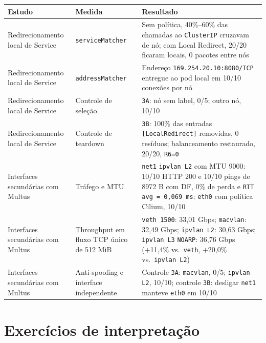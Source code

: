 \documentclass[12pt,openany,oneside,a4paper,chapter=TITLE,english,brazil]{abntex2}
\begin{document}
\begin{quadro}[!htbp]
\caption{Resultados de encaminhamento e Multus}
\footnotesize
\begin{tabularx}{\textwidth}{|>{\raggedright\arraybackslash\hsize=0.755\hsize}X|>{\raggedright\arraybackslash\hsize=0.831\hsize}X|>{\raggedright\arraybackslash\hsize=1.415\hsize}X|}
\hline
\textbf{Estudo} & \textbf{Medida} & \textbf{Resultado} \\
\hline
Redirecionamento local de Service & \texttt{service\allowbreak{}Matcher} & Sem política, 40\%--60\% das chamadas ao \texttt{Cluster\allowbreak{}IP}
cruzavam de nó; com Local Redirect, 20/20 ficaram locais, 0 pacotes
entre nós \\
\hline
Redirecionamento local de Service & \texttt{address\allowbreak{}Matcher} & Endereço
\texttt{169.\allowbreak{}254.\allowbreak{}20.\allowbreak{}10:\allowbreak{}8080/\allowbreak{}TCP}
entregue ao pod local em 10/10 conexões por nó \\
\hline
Redirecionamento local de Service & Controle de seleção & \texttt{3A}: nó sem label, 0/5; outro nó, 10/10 \\
\hline
Redirecionamento local de Service & Controle de teardown & \texttt{3B}: 100\% das entradas \texttt{[Local\allowbreak{}Redirect]}
removidas, 0 resíduos; balanceamento restaurado, 20/20,
\texttt{R6=\allowbreak{}0} \\
\hline
Interfaces secundárias com Multus & Tráfego e MTU & \texttt{net1} \texttt{ipvlan L2} com MTU 9000: 10/10 HTTP 200 e 10/10
pings de 8972 B com DF, 0\% de perda e
\texttt{RTT avg =\allowbreak{} 0,\allowbreak{}069 ms}; \texttt{eth0} com
política Cilium, 10/10 \\
\hline
Interfaces secundárias com Multus & Throughput em fluxo TCP único de 512 MiB & \texttt{veth 1500}: 33,01 Gbps; \texttt{macvlan}: 32,49 Gbps;
\texttt{ipvlan L2}: 30,63 Gbps; \texttt{ipvlan L3} \texttt{NOARP}: 36,76
Gbps (+11,4\% vs.~\texttt{veth}, +20,0\% vs.~\texttt{ipvlan L2}) \\
\hline
Interfaces secundárias com Multus & Anti-spoofing e interface independente & Controle \texttt{3A}: \texttt{macvlan}, 0/5; \texttt{ipvlan L2}, 10/10;
controle \texttt{3B}: desligar \texttt{net1} manteve \texttt{eth0} em
10/10 \\
\hline
\end{tabularx}
\end{quadro}

\section{Exercícios de interpretação}\label{exercuxedcios-de-interpretauxe7uxe3o-3}
\end{document}
